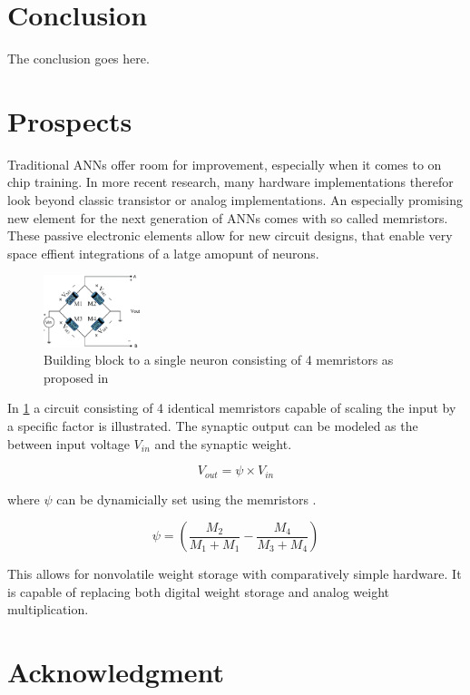 \documentclass[conference]{IEEEtran}
\begin{document}
    \section{Conclusion}
    The conclusion goes here.

    \section*{Prospects}

    Traditional ANNs offer room for improvement, especially when it comes to on chip training.
    In more recent research, many hardware implementations therefor look beyond classic transistor or analog implementations.
    An especially promising new element for the next generation of ANNs comes with so called memristors.
    These passive electronic elements allow for new circuit designs, that enable very space effient integrations of a latge amopunt of neurons.

    \begin{figure}[h]
        \centering
        \includegraphics[width=0.25\textwidth]{resources/memristor.png}
        \caption{Building block to a single neuron consisting of 4 memristors as proposed in \cite[Fig.~1]{adhikari2012memristor}}
        \label{fig:memristor}
    \end{figure}

    In \ref{fig:memristor} a circuit consisting of 4 identical memristors capable of scaling the input by a specific factor is illustrated.
    The synaptic output can be modeled as the between input voltage $V_{in}$ and the synaptic weight.

    \[V_{out} = \psi \times V_{in}\]

    where $\psi$ can be dynamicially set using the memristors \cite{adhikari2012memristor}.

    \[\psi = \left(\frac{M_2}{M_1+M_1} - \frac{M_4}{M_3+M_4}\right)\]

    This allows for nonvolatile weight storage with comparatively simple hardware.
    It is capable of replacing both digital weight storage and analog weight multiplication.


    \section*{Acknowledgment}



    \medskip

    
    
\end{document}
